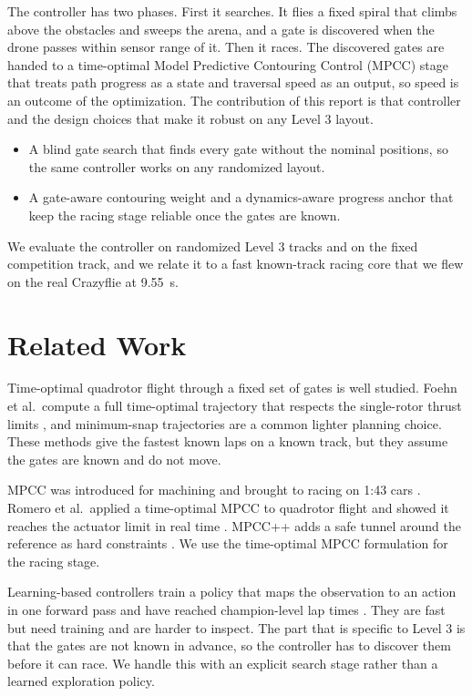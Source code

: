 \documentclass[conference]{IEEEtran}
\begin{document}
The controller has two phases. First it searches. It flies a fixed spiral that climbs above the obstacles and sweeps the arena, and a gate is discovered when the drone passes within sensor range of it. Then it races. The discovered gates are handed to a time-optimal Model Predictive Contouring Control (MPCC) stage \cite{mpcc,lam} that treats path progress as a state and traversal speed as an output, so speed is an outcome of the optimization. The contribution of this report is that controller and the design choices that make it robust on any Level 3 layout.
\begin{itemize}
\item A blind gate search that finds every gate without the nominal positions, so the same controller works on any randomized layout.
\item A gate-aware contouring weight and a dynamics-aware progress anchor that keep the racing stage reliable once the gates are known.
\end{itemize}
We evaluate the controller on randomized Level 3 tracks and on the fixed competition track, and we relate it to a fast known-track racing core that we flew on the real Crazyflie at 9.55~s.

\section{Related Work}
\label{sec:related}
Time-optimal quadrotor flight through a fixed set of gates is well studied. Foehn et al.\ compute a full time-optimal trajectory that respects the single-rotor thrust limits \cite{foehn}, and minimum-snap trajectories \cite{minsnap} are a common lighter planning choice. These methods give the fastest known laps on a known track, but they assume the gates are known and do not move.

MPCC was introduced for machining \cite{lam} and brought to racing on 1:43 cars \cite{liniger}. Romero et al.\ applied a time-optimal MPCC to quadrotor flight and showed it reaches the actuator limit in real time \cite{mpcc}. MPCC++ adds a safe tunnel around the reference as hard constraints \cite{mpccpp}. We use the time-optimal MPCC formulation for the racing stage.

Learning-based controllers train a policy that maps the observation to an action in one forward pass and have reached champion-level lap times \cite{champion,songrl}. They are fast but need training and are harder to inspect. The part that is specific to Level 3 is that the gates are not known in advance, so the controller has to discover them before it can race. We handle this with an explicit search stage rather than a learned exploration policy.
\end{document}
